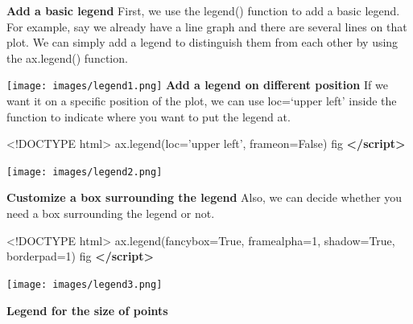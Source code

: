 \documentclass[]{book}
\newenvironment{Shaded}{\begin{snugshade}}{\end{snugshade}}
\newcommand{\DataTypeTok}[1]{\textcolor[rgb]{0.13,0.29,0.53}{#1}}
\newcommand{\KeywordTok}[1]{\textcolor[rgb]{0.13,0.29,0.53}{\textbf{#1}}}
\newcommand{\NormalTok}[1]{#1}
\begin{document}
\textbf{Add a basic legend}
First, we use the legend() function to add a basic legend. For example, say we already have a line graph and there are several lines on that plot. We can simply add a legend to distinguish them from each other by using the ax.legend() function.

\begin{Shaded}
\end{Shaded}

\texttt{[image: images/legend1.png]}
\textbf{Add a legend on different position}
If we want it on a specific position of the plot, we can use loc=`upper left' inside the function to indicate where you want to put the legend at.

\begin{Shaded}
\begin{Highlighting}[]
\DataTypeTok{<!DOCTYPE }\NormalTok{html}\DataTypeTok{>}
\NormalTok{ax.legend(loc='upper left', frameon=False)}
\NormalTok{fig}
\KeywordTok{</script>}
\end{Highlighting}
\end{Shaded}

\texttt{[image: images/legend2.png]}

\textbf{Customize a box surrounding the legend}
Also, we can decide whether you need a box surrounding the legend or not.

\begin{Shaded}
\begin{Highlighting}[]
\DataTypeTok{<!DOCTYPE }\NormalTok{html}\DataTypeTok{>}
\NormalTok{ax.legend(fancybox=True, framealpha=1, shadow=True, borderpad=1)}
\NormalTok{fig}
\KeywordTok{</script>}
\end{Highlighting}
\end{Shaded}

\texttt{[image: images/legend3.png]}

\textbf{Legend for the size of points}
\end{document}
